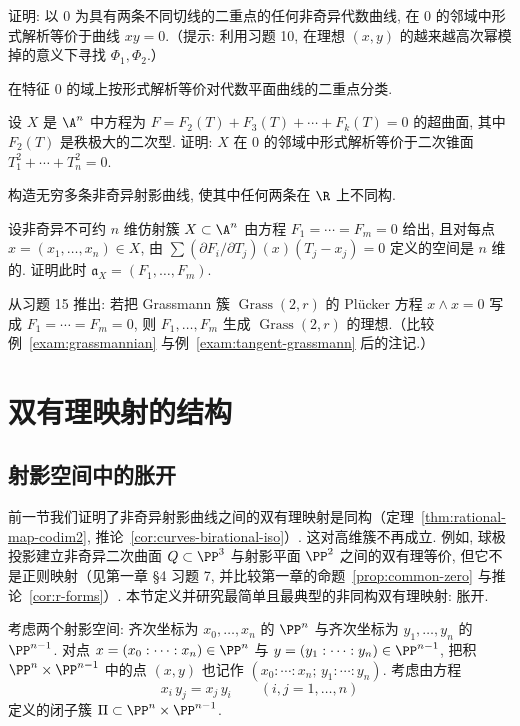 \begin{compactenum}
	\item 证明: 以 $0$ 为具有两条不同切线的二重点的任何非奇异代数曲线, 在 $0$ 的邻域中形式解析等价于曲线 $xy = 0$.（提示: 利用习题 10, 在理想 $(x,y)$ 的越来越高次幂模掉的意义下寻找 $\Phi_1, \Phi_2$.）
	\item 在特征 $0$ 的域上按形式解析等价对代数平面曲线的二重点分类.
	\item 设 $X$ 是 $\A^n$ 中方程为 $F = F_2(T) + F_3(T) + \cdots + F_k(T) = 0$ 的超曲面, 其中 $F_2(T)$ 是秩极大的二次型. 证明: $X$ 在 $0$ 的邻域中形式解析等价于二次锥面 $T_1^2 + \cdots + T_n^2 = 0$.
	\item 构造无穷多条非奇异射影曲线, 使其中任何两条在 $\R$ 上不同构.
	\item 设非奇异不可约 $n$ 维仿射簇 $X \subset \A^n$ 由方程 $F_1 = \cdots = F_m = 0$ 给出, 且对每点 $x = (x_1, \ldots, x_n) \in X$, 由 $\sum (\partial F_i/\partial T_j)(x)(T_j - x_j) = 0$ 定义的空间是 $n$ 维的. 证明此时 $\mathfrak a_X = (F_1, \ldots, F_m)$.
	\item 从习题 15 推出: 若把 Grassmann 簇 $\operatorname{Grass}(2, r)$ 的 Plücker 方程 $x \wedge x = 0$ 写成 $F_1 = \cdots = F_m = 0$, 则 $F_1, \ldots, F_m$ 生成 $\operatorname{Grass}(2, r)$ 的理想.（比较例~\ref{exam:grassmannian} 与例~\ref{exam:tangent-grassmann} 后的注记.）
\end{compactenum}

\section{双有理映射的结构}

\subsection{射影空间中的胀开}

前一节我们证明了非奇异射影曲线之间的双有理映射是同构（定理~\ref{thm:rational-map-codim2}, 推论~\ref{cor:curves-birational-iso}）. 这对高维簇不再成立. 例如, 球极投影建立非奇异二次曲面 $Q \subset \PP^3$ 与射影平面 $\PP^2$ 之间的双有理等价, 但它不是正则映射（见第一章 §4 习题 7, 并比较第一章的命题~\ref{prop:common-zero} 与推论~\ref{cor:r-forms}）. 本节定义并研究最简单且最典型的非同构双有理映射: 胀开.

考虑两个射影空间: 齐次坐标为 $x_0, \ldots, x_n$ 的 $\PP^n$ 与齐次坐标为 $y_1, \ldots, y_n$ 的 $\PP^{n-1}$. 对点 $x = (x_0 : \cdots : x_n) \in \PP^n$ 与 $y = (y_1 : \cdots : y_n) \in \PP^{n-1}$, 把积 $\PP^n \times \PP^{n-1}$ 中的点 $(x, y)$ 也记作 $(x_0 : \cdots : x_n;\, y_1 : \cdots : y_n)$. 考虑由方程
\begin{equation}
	\label{eq:2.26}
	x_i\, y_j = x_j\, y_i \qquad (i, j = 1, \ldots, n)
\end{equation}
定义的闭子簇 $\Pi \subset \PP^n \times \PP^{n-1}$.

